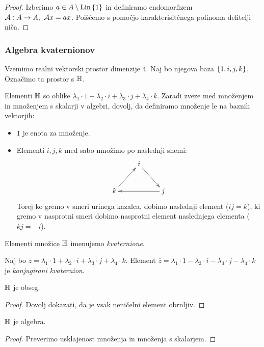 \begin{proof}
    Izberimo $a \in A \setminus \operatorname{Lin} \left\{1\right\}$ in definiramo endomorfizem $\mathcal{A}: A \to A, \ \mathcal{A}x = ax$. Poiščemo s pomočjo karakterisitčnega polinoma delitelji niča.
\end{proof}

\subsubsection*{Algebra kvaternionov}
\begin{primer}
    Vzemimo realni vektorski prostor dimenzije $4$. Naj bo njegova baza $\left\{1, i, j, k\right\}$. Označimo ta prostor s $\mathbb{H}$.
    
    Elementi $\mathbb{H}$ so oblike $\lambda_1 \cdot 1 + \lambda_2 \cdot i + \lambda_3 \cdot j + \lambda_4 \cdot k$. Zaradi zveze med množenjem in množenjem s skalarji v algebri, dovolj, da definiramo množenje le na baznih vektorjih:
    \begin{itemize}
        \item $1$ je enota za množenje.
        \item Elementi $i, j, k$ med sabo množimo po naslednji shemi:
        $$\xymatrix{
            & i \ar@{->}[rd] &  \\
           k \ar@{->}[ru] &  & j \ar@{->}[ll]
           }$$
        Torej ko gremo v smeri urinega kazalca, dobimo naslednji element ($ij = k$), ki gremo v nasprotni smeri dobimo nasprotni element naslednjega elementa ($kj = -i$).
    \end{itemize}
    Elementi množice $\mathbb{H}$ imenujemo \emph{kvaternione}.

    Naj bo $z = \lambda_1 \cdot 1 + \lambda_2 \cdot i + \lambda_3 \cdot j + \lambda_4 \cdot k$. Element $\overline{z} = \lambda_1 \cdot 1 - \lambda_2 \cdot i - \lambda_3 \cdot j - \lambda_4 \cdot k$ je \emph{konjugirani kvaternion}.    
\end{primer}

\begin{trditev}
    $\mathbb{H}$ je obseg.
\end{trditev}

\begin{proof}
    Dovolj dokazati, da je vsak neničelni element obrnljiv.
\end{proof}

\begin{trditev}
    $\mathbb{H}$ je algebra.
\end{trditev}

\begin{proof}
    Preverimo usklajenost množenja in množenja s skalarjem.
\end{proof}

